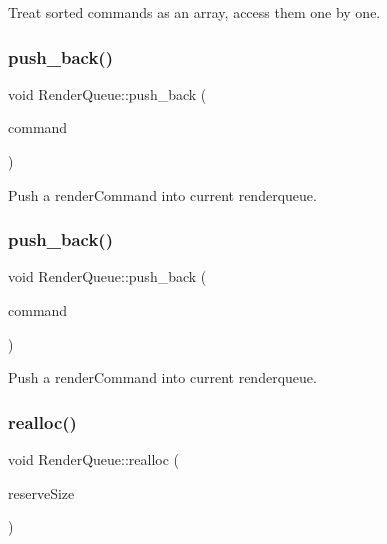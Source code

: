 Treat sorted commands as an array, access them one by one. \mbox{\label{classRenderQueue_adedac420d661ed5b32a8f47d9f6c842b}} 
\subsubsection{\texorpdfstring{push\+\_\+back()}{push\_back()}\hspace{0.1cm}{\footnotesize\ttfamily [1/2]}}
{\footnotesize\ttfamily void Render\+Queue\+::push\+\_\+back (\begin{DoxyParamCaption}\item[{\hyperlink{classRenderCommand}{Render\+Command} $\ast$}]{command }\end{DoxyParamCaption})}

Push a render\+Command into current renderqueue. \mbox{\label{classRenderQueue_adedac420d661ed5b32a8f47d9f6c842b}} 
\subsubsection{\texorpdfstring{push\+\_\+back()}{push\_back()}\hspace{0.1cm}{\footnotesize\ttfamily [2/2]}}
{\footnotesize\ttfamily void Render\+Queue\+::push\+\_\+back (\begin{DoxyParamCaption}\item[{\hyperlink{classRenderCommand}{Render\+Command} $\ast$}]{command }\end{DoxyParamCaption})}

Push a render\+Command into current renderqueue. \mbox{\label{classRenderQueue_a6a9e1c224b1c5d3c7ac92f9a3e14f23c}} 
\subsubsection{\texorpdfstring{realloc()}{realloc()}\hspace{0.1cm}{\footnotesize\ttfamily [1/2]}}
{\footnotesize\ttfamily void Render\+Queue\+::realloc (\begin{DoxyParamCaption}\item[{size\+\_\+t}]{reserve\+Size }\end{DoxyParamCaption})}

